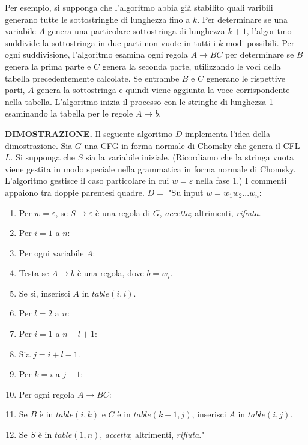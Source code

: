\documentclass{article}
\begin{document}
Per esempio, si supponga che l'algoritmo abbia già stabilito quali varibili generano tutte le sottostringhe di lunghezza fino a $k$.
Per determinare se una variabile $A$ genera una particolare sottostringa di lunghezza $k + 1$, l'algoritmo suddivide la sottostringa in due parti non vuote in tutti i $k$ modi possibili. 
Per ogni suddivisione, l'algoritmo esamina ogni regola $A \rightarrow BC$ per determinare se $B$ genera la prima parte e $C$ genera la seconda parte, utilizzando le voci della tabella precedentemente calcolate.
Se entrambe $B$ e $C$ generano le rispettive parti, $A$ genera la sottostringa e quindi viene aggiunta la voce corrispondente nella tabella. 
L'algoritmo inizia il processo con le stringhe di lunghezza 1 esaminando la tabella per le regole $A \rightarrow b$.

\text{}
\newline
\textbf{DIMOSTRAZIONE.}
Il seguente algoritmo $D$ implementa l'idea della dimostrazione. 
Sia $G$ una CFG in forma normale di Chomsky che genera il CFL $L$.
Si supponga che $S$ sia la variabile iniziale. 
(Ricordiamo che la stringa vuota viene gestita in modo speciale nella grammatica in forma normale di Chomsky. 
L'algoritmo gestisce il caso particolare in cui $w = \varepsilon$ nella fase 1.) 
I commenti appaiono tra doppie parentesi quadre.
\newline
$D =$ "Su input $w = w_1w_2...w_n$:
\begin{enumerate}
    \item Per $w = \varepsilon$, se $S \rightarrow \varepsilon$ è una regola di $G$, \textit{accetta}; altrimenti, \textit{rifiuta}.\newline [caso $w = \varepsilon$]
    \item Per $i = 1$ a $n$: 
    \item \quad Per ogni variabile $A$:
    \item \qquad Testa se $A \rightarrow b$ è una regola, dove $b = w_i$.
    \item \qquad Se sì, inserisci $A$ in $table(i, i)$.
    \item Per $l = 2$ a $n$: 
    \item \quad Per $i = 1$ a $n - l + 1$: 
    \item \qquad \quad Sia $j = i + l - 1$. 
    \item \qquad \quad Per $k = i$ a $j - 1$: 
    \item \qquad \qquad Per ogni regola $A \rightarrow BC$:
    \item \qquad \qquad \quad Se $B$ è in $table(i, k)$ e $C$ è in $table(k + 1, j)$, inserisci $A$ in $table(i, j)$.
    \item Se $S$ è in $table(1, n)$, \textit{accetta}; altrimenti, \textit{rifiuta}."
\end{enumerate}
\end{document}
